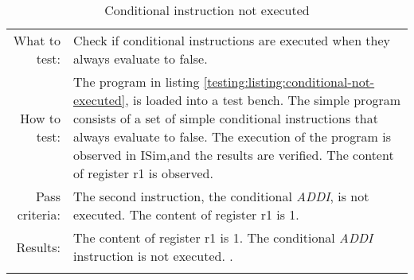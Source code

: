\begin{table}[H]
  \begin{tabular}{r | p{8cm}}
    \noalign{\smallskip}\hline\noalign{\smallskip}
    
    What to test:  & Check if conditional instructions are executed when they always evaluate to 
                     false. \\

    \noalign{\smallskip}\hline\noalign{\smallskip}

    How to test:   &  The program in listing \ref{testing:listing:conditional-not-executed}, is loaded into a test bench. 
                       The simple program consists of a set of simple conditional instructions that         
                       always evaluate to false. The execution of the program is observed in 
                       ISim,and the results are verified. The content of register r1 is observed.\\

    \noalign{\smallskip}\hline\noalign{\smallskip}

    Pass criteria: & The second instruction, the conditional \emph{ADDI}, is not executed. The content of register r1 is 1.  \\

    \noalign{\smallskip}\hline\noalign{\smallskip}
    
    Results: & The content of register r1 is 1. The conditional \emph{ADDI} instruction is not executed. .  \\
   \noalign{\smallskip}\hline\noalign{\smallskip}
  
  
  
  \end{tabular}
  \caption{Conditional instruction not executed}
  \label{testing:fitness:conditional_not_taken}
\end{table}
